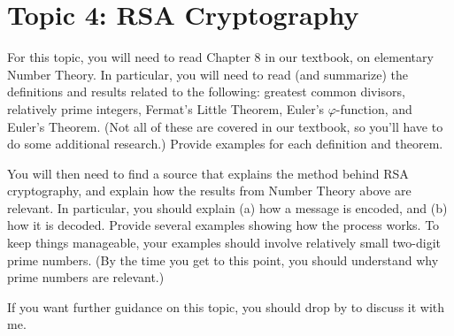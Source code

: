 \documentclass[letterpaper,12pt]{article}
\theoremstyle{definition}
\begin{document}
\section*{Topic 4: RSA Cryptography}
For this topic, you will need to read Chapter 8 in our textbook, on elementary Number Theory. In particular, you will need to read (and summarize) the definitions and results related to the following: greatest common divisors, relatively prime integers, Fermat's Little Theorem, Euler's $\varphi$-function, and Euler's Theorem. (Not all of these are covered in our textbook, so you'll have to do some additional research.) Provide examples for each definition and theorem.

You will then need to find a source that explains the method behind RSA cryptography, and explain how the results from Number Theory above are relevant. In particular, you should explain (a) how a message is encoded, and (b) how it is decoded. Provide several examples showing how the process works. To keep things manageable, your examples should involve relatively small two-digit prime numbers. (By the time you get to this point, you should understand why prime numbers are relevant.)

If you want further guidance on this topic, you should drop by to discuss it with me.
\end{document}
